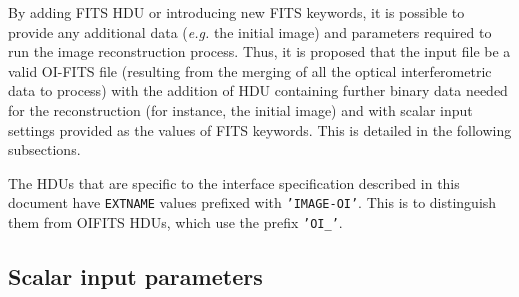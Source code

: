 \documentclass{article}
\newcommand*{\ROW}{} %
\newcommand*{\ROWTITLE}{} %
\newcommand{\KEYWORD}[1]{\texttt{#1}} %
\newcommand{\STRING}[1]{\texttt{'#1'}} %
\begin{document}
By adding FITS HDU or introducing new FITS keywords, it is possible to
provide any additional data (\emph{e.g.} the initial image) and
parameters required to run the image reconstruction process.  Thus, it
is proposed that the input file be a valid OI-FITS file (resulting
from the merging of all the optical interferometric data to process)
with the addition of HDU containing further binary data needed for the
reconstruction (for instance, the initial image) and with scalar input
settings provided as the values of FITS keywords.  This is detailed in
the following subsections.

The HDUs that are specific to the interface specification described in
this document have \KEYWORD{EXTNAME} values prefixed with
\STRING{IMAGE-OI}. This is to distinguish them from OIFITS HDUs, which use the
prefix \STRING{OI\_}.


\subsection{Scalar input parameters}

\renewcommand{\ROW}[3]{\KEYWORD{#1} & #2 &#3 \\}
\renewcommand{\ROWTITLE}[1]{\multicolumn{3}{c}{\textbf{#1}} \\
  Keyword & Type & Description \\}
\end{document}
